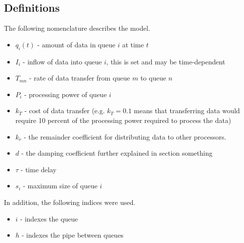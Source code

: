 \documentclass{article}
\begin{document}
\subsection{Definitions}

The following nomenclature describes the model. 

\begin{itemize}
\item $q_i(t)$ - amount of data in queue $i$ at time $t$
\item $I_i$ - inflow of data into queue $i$, this is set and may be time-dependent
\item $T_{mn}$ - rate of data transfer from queue $m$ to queue $n$
\item $P_i$ - processing power of queue $i$
\item $k_T$ - cost of data transfer (e.g. $k_T = 0.1$ means that transferring data would require 10 percent of the processing power required to process the data)
\item $k_r$ - the remainder coefficient for distributing data to other processors. 
\item $d$ - the damping coefficient further explained in section something
\item $\tau$ - time delay
\item $s_i$ - maximum size of queue $i$
\end{itemize}

In addition, the following indices were used.

\begin{itemize}
\item $i$ - indexes the queue
\item $h$ - indexes the pipe between queues
\end{itemize}
\end{document}
